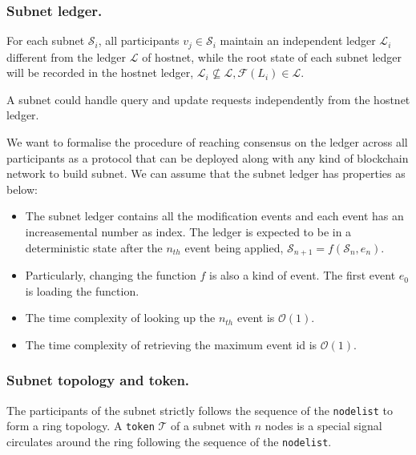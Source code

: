 \documentclass[11pt]{article}
\begin{document}
\subsubsection{Subnet ledger.}
For each subnet $\mathcal{S}_{i}$, all participants \(v_{j} \in \mathcal{S}_{i}\) maintain an independent ledger $\mathcal{L}_{i}$ different from the ledger $\mathcal{L}$ of hostnet, while the root state of each subnet ledger will be recorded in the hostnet ledger, \( \mathcal{L}_{i} \nsubseteq \mathcal{L}, \mathcal{F}(L_{i}) \in \mathcal{L} \).

A subnet could handle query and update requests independently from the hostnet ledger.

We want to formalise the procedure of reaching consensus on the ledger across all participants as a protocol that can be deployed along with any kind of blockchain network to build subnet. We can assume that the subnet ledger has properties as below:

\begin{itemize}
\item The subnet ledger contains all the modification events and each event has an increasemental number as index.
The ledger is expected to be in a deterministic state after the $n_{th}$ event being applied, \(\mathcal{S}_{n+1} = f(\mathcal{S}_{n}, e_{n})\).
\item Particularly, changing the function $f$ is also a kind of event. The first event $e_{0}$ is loading the function.
\item The time complexity of looking up the $n_{th}$ event is $\mathcal{O}(1)$.
\item The time complexity of retrieving the maximum event id is $\mathcal{O}(1)$.
\end{itemize}

\subsubsection{Subnet topology and token.}
The participants of the subnet strictly follows the sequence of the \texttt{nodelist} to form a ring topology.
A \texttt{token} $\mathcal{T}$ of a subnet with $n$ nodes is a special signal circulates around the ring following the sequence of the \texttt{nodelist}.
\end{document}
